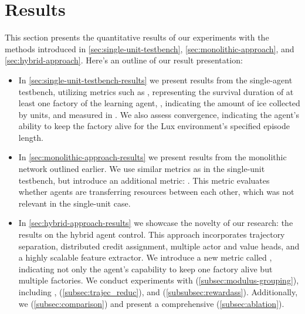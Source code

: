 \chapter{Results}
\label{ch:resu}

\noindent This section presents the quantitative results of our experiments with the methods introduced in \autoref{sec:single-unit-testbench}, \autoref{sec:monolithic-approach}, and \autoref{sec:hybrid-approach}. Here's an outline of our result presentation:

\begin{itemize}

\item In \autoref{sec:single-unit-testbench-results} we present results from the single-agent testbench, utilizing metrics such as , representing the survival duration of at least one factory of the learning agent, , indicating the amount of ice collected by units, and  measured in . We also assess convergence, indicating the agent's ability to keep the factory alive for the Lux environment's specified episode length.

\item In \autoref{sec:monolithic-approach-results} we present results from the monolithic network outlined earlier. We use similar metrics as in the single-unit testbench, but introduce an additional metric: . This metric evaluates whether agents are transferring resources between each other, which was not relevant in the single-unit case.

\item In \autoref{sec:hybrid-approach-results} we showcase the novelty of our research: the results on the hybrid agent control. This approach incorporates trajectory separation, distributed credit assignment, multiple actor and value heads, and a highly scalable feature extractor. We introduce a new metric called , indicating not only the agent's capability to keep one factory alive but multiple factories. We conduct experiments with  (\autoref{subsec:modulus-grouping}), including ,  (\autoref{subsec:trajec_reduc}), and  (\autoref{subsubsec:rewardass}). Additionally, we  (\autoref{subsec:comparison}) and present a comprehensive  (\autoref{subsec:ablation}).

\end{itemize}


